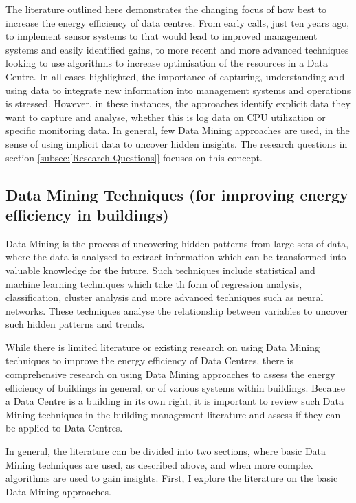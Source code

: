 \documentclass[12pt]{scrartcl}
\begin{document}
The literature outlined here demonstrates the changing focus of how best to increase the energy efficiency of data centres. From early calls, just ten years ago, to implement sensor systems to that would lead to improved management systems and easily identified gains, to more recent and more advanced techniques looking to use algorithms to increase optimisation of the resources in a Data Centre. In all cases highlighted, the importance of capturing, understanding and using data to integrate new information into management systems and operations is stressed. However, in these instances, the approaches identify explicit data they want to capture and analyse, whether this is log data on CPU utilization or specific monitoring data. In general, few Data Mining approaches are used, in the sense of using implicit data to uncover hidden insights. The research questions in section \ref{subsec:[Research Questions]} focuses on this concept.  


\subsection{Data Mining Techniques (for improving energy efficiency in buildings)}  
\label{subsec:[Data Mining Techniques]}
Data Mining is the process of uncovering hidden patterns from large sets of data, where the data is analysed to extract information which can be transformed into valuable knowledge for the future. Such techniques include statistical and machine learning techniques which take th form of regression analysis, classification, cluster analysis and more advanced techniques such as neural networks. These techniques analyse the relationship between variables to uncover such hidden patterns and trends.    

While there is limited literature or existing research on using Data Mining techniques to improve the energy efficiency of Data Centres, there is comprehensive research on using Data Mining approaches to assess the energy efficiency of buildings in general, or of various systems within buildings. Because a Data Centre is a building in its own right, it is important to review such Data Mining techniques in the building management literature and assess if they can be applied to Data Centres.   

In general, the literature can be divided into two sections, where basic Data Mining techniques are used, as described above, and when more complex algorithms are used to gain insights. First, I explore the literature on the basic Data Mining approaches. 
\end{document}
